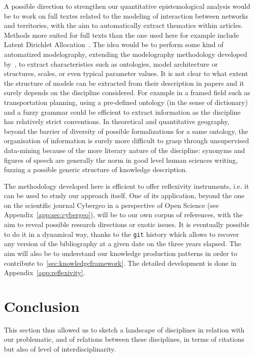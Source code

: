 \documentclass[galley]{jtlu-article-2col}
\begin{document}
A possible direction to strengthen our quantitative epistemological analysis would be to work on full textes related to the modeling of interaction between networks and territories, with the aim to automatically extract thematics within articles. Methods more suited for full texts than the one used here for example include Latent Dirichlet Allocation~\cite{blei2003latent}. The idea would be to perform some kind of automatized modelography, extending the modelography methodology developed by~\cite{schmitt2013modelographie}, to extract characteristics such as ontologies, model architecture or structures, scales, or even typical parameter values. It is not clear to what extent the structure of models can be extracted from their description in papers and it surely depends on the discipline considered. For example in a framed field such as transportation planning, using a pre-defined ontology (in the sense of dictionary) and a fuzzy grammar could be efficient to extract information as the discipline has relatively strict conventions. In theoretical and quantitative geography, beyond the barrier of diversity of possible formalizations for a same ontology, the organisation of information is surely more difficult to grasp through unsupervised data-mining because of the more literary nature of the discipline: synonyms and figures of speech are generally the norm in good level human sciences writing, fuzzing a possible generic structure of knowledge description.

The methodology developed here is efficient to offer reflexivity instruments, i.e. it can be used to study our approach itself. One of its application, beyond the one on the scientific journal Cybergeo in a perspective of Open Science (see Appendix~\ref{app:sec:cybergeo}), will be to our own corpus of references, with the aim to reveal possible research directions or exotic issues. It is eventually possible to do it in a dynamical way, thanks to the \texttt{git} history which allows to recover any version of the bibliography at a given date on the three years elapsed. The aim will also be to understand our knowledge production patterns in order to contribute to~\ref{sec:knowledgeframework}. The detailed development is done in Appendix~\ref{app:reflexivity}.







\section{Conclusion}


This section thus allowed us to sketch a landscape of disciplines in relation with our problematic, and of relations between these disciplines, in terms of citations but also of level of interdisciplinarity.











\end{document}
